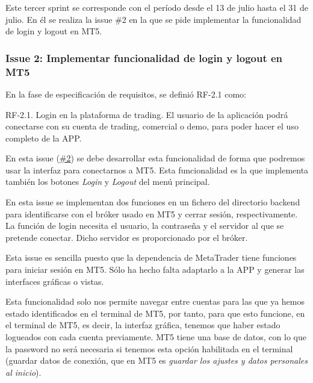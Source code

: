 Este tercer sprint se corresponde con el período desde el 13 de julio hasta el 31 de julio. En él se realiza la issue \#2 en la que se pide implementar la funcionalidad de login y logout en MT5.\newline

\subsubsection{Issue 2: Implementar funcionalidad de login y logout en MT5}

En la fase de especificación de requisitos, se definió RF-2.1 como:\newline

RF-2.1. Login en la plataforma de trading. El usuario de la aplicación podrá conectarse con su cuenta de trading, comercial o demo, para poder hacer el uso completo de la APP.\newline

En esta issue (\href{https://github.com/mcarmona99/TFG/issues/2}{\#2}) se debe desarrollar esta funcionalidad de forma que podremos usar la interfaz para conectarnos a MT5. Esta funcionalidad es la que implementa también los botones \textit{Login} y \textit{Logout} del menú principal.\newline

En esta issue se implementan dos funciones en un fichero del directorio backend para identificarse con el bróker usado en MT5 y cerrar sesión, respectivamente. La función de login necesita el usuario, la contraseña y el servidor al que se pretende conectar. Dicho servidor es proporcionado por el bróker.\newline

Esta issue es sencilla puesto que la dependencia de MetaTrader tiene funciones para iniciar sesión en MT5. Sólo ha hecho falta adaptarlo a la APP y generar las interfaces gráficas o vistas. \newline

Esta funcionalidad solo nos permite navegar entre cuentas para las que ya hemos estado identificados en el terminal de MT5, por tanto, para que esto funcione, en el terminal de MT5, es decir, la interfaz gráfica, tenemos que haber estado logueados con cada cuenta previamente. MT5 tiene una base de datos, con lo que la password no será necesaria si tenemos esta opción habilitada en el terminal (guardar datos de conexión, que en MT5 es \textit{guardar los ajustes y datos personales al inicio}).\newline

